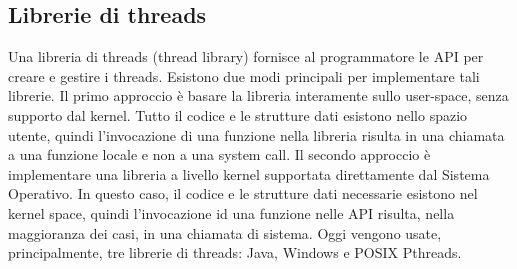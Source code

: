 \documentclass[a4paper]{article}
\begin{document}
\subsection{Librerie di threads}
Una libreria di threads (thread library) fornisce al programmatore le API per creare e gestire i threads. Esistono due modi principali per implementare tali librerie. Il primo approccio è basare la libreria interamente sullo user-space, senza supporto dal kernel. Tutto il codice e le strutture dati esistono nello spazio utente, quindi l'invocazione di una funzione nella libreria risulta in una chiamata a una funzione locale e non a una system call. \newline
Il secondo approccio è implementare una libreria a livello kernel supportata direttamente dal Sistema Operativo. In questo caso, il codice e le strutture dati necessarie esistono nel kernel space, quindi l'invocazione id una funzione nelle API risulta, nella maggioranza dei casi, in una chiamata di sistema.\newline
Oggi vengono usate, principalmente, tre librerie di threads: Java, Windows e POSIX Pthreads.
\end{document}
